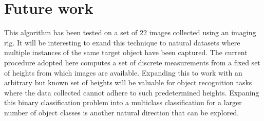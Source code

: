 \documentclass {udthesis}
\begin{document}
\section{Future work}

This algorithm has been tested on a set of 22 images collected using an imaging rig. It will be interesting to exand this technique to natural datasets where multiple instances of the same target object have been captured. The current procedure adopted here computes a set of discrete measurements from a fixed set of heights from which images are available. Expanding this to work with an arbitrary but known set of heights will be valuable for object recognition tasks where the data collected cannot adhere to such predetermined heights. Expaning this binary classification problem into a multiclass classification for a larger number of object classes is another natural direction that can be explored.


\printglossary[type=\acronymtype]                  
\end{document}
